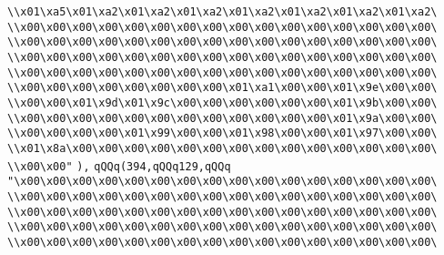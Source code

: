 \verb|\\x01\xa5\x01\xa2\x01\xa2\x01\xa2\x01\xa2\x01\xa2\x01\xa2\x01\xa2\|\newline
\verb|\\x00\x00\x00\x00\x00\x00\x00\x00\x00\x00\x00\x00\x00\x00\x00\x00\|\newline
\verb|\\x00\x00\x00\x00\x00\x00\x00\x00\x00\x00\x00\x00\x00\x00\x00\x00\|\newline
\verb|\\x00\x00\x00\x00\x00\x00\x00\x00\x00\x00\x00\x00\x00\x00\x00\x00\|\newline
\verb|\\x00\x00\x00\x00\x00\x00\x00\x00\x00\x00\x00\x00\x00\x00\x00\x00\|\newline
\verb|\\x00\x00\x00\x00\x00\x00\x00\x00\x01\xa1\x00\x00\x01\x9e\x00\x00\|\newline
\verb|\\x00\x00\x01\x9d\x01\x9c\x00\x00\x00\x00\x00\x00\x01\x9b\x00\x00\|\newline
\verb|\\x00\x00\x00\x00\x00\x00\x00\x00\x00\x00\x00\x00\x01\x9a\x00\x00\|\newline
\verb|\\x00\x00\x00\x00\x01\x99\x00\x00\x01\x98\x00\x00\x01\x97\x00\x00\|\newline
\verb|\\x01\x8a\x00\x00\x00\x00\x00\x00\x00\x00\x00\x00\x00\x00\x00\x00\|\newline
\verb|\\x00\x00"|\newline
\verb|),|\newline
\verb|qQQq(394,qQQq129,qQQq|\newline
\verb|"\x00\x00\x00\x00\x00\x00\x00\x00\x00\x00\x00\x00\x00\x00\x00\x00\|\newline
\verb|\\x00\x00\x00\x00\x00\x00\x00\x00\x00\x00\x00\x00\x00\x00\x00\x00\|\newline
\verb|\\x00\x00\x00\x00\x00\x00\x00\x00\x00\x00\x00\x00\x00\x00\x00\x00\|\newline
\verb|\\x00\x00\x00\x00\x00\x00\x00\x00\x00\x00\x00\x00\x00\x00\x00\x00\|\newline
\verb|\\x00\x00\x00\x00\x00\x00\x00\x00\x00\x00\x00\x00\x00\x00\x00\x00\|\newline
